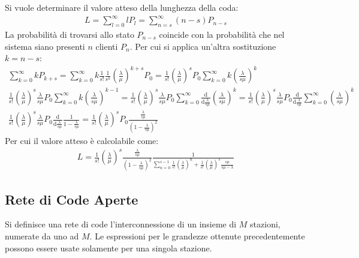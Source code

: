 \documentclass{article}
\newcommand{\df}{\mathrm{d}}
\numberwithin{equation}{subsection}
\begin{document}
Si vuole determinare il valore atteso della lunghezza della coda:
\begin{gather*}
    L=\displaystyle\sum_{l=0}^{\infty}lP_l=\sum_{n=s}^{\infty}(n-s)P_{n-s}
\end{gather*}
La probabilità di trovarsi allo stato $P_{n-s}$ coincide con la probabilità che nel sistema siano presenti $n$ clienti $P_n$. Per cui si applica un'altra sostituzione $k=n-s$:
\begin{gather*}
    \displaystyle\sum_{k=0}^{\infty}kP_{k+s}=\sum_{k=0}^{\infty}k\frac{1}{s!}\frac{1}{s^k}\left(\frac{\lambda}{\mu}\right)^{k+s}P_0=\frac{1}{s!}\left(\frac{\lambda}{\mu}\right)^{s}P_0\sum_{k=0}^{\infty}k\left(\frac{\lambda}{s\mu}\right)^{k}\\
    \displaystyle\frac{1}{s!}\left(\frac{\lambda}{\mu}\right)^{s}\frac{\lambda}{s\mu}P_0\sum_{k=0}^{\infty}k\left(\frac{\lambda}{s\mu}\right)^{k-1}=\frac{1}{s!}\left(\frac{\lambda}{\mu}\right)^{s}\frac{\lambda}{s\mu}P_0\sum_{k=0}^{\infty}\frac{\df}{\df\frac{\lambda}{s\mu}}\left(\frac{\lambda}{s\mu}\right)^{k}
    =\frac{1}{s!}\left(\frac{\lambda}{\mu}\right)^{s}\frac{\lambda}{s\mu}P_0\frac{\df}{\df\frac{\lambda}{s\mu}}\sum_{k=0}^{\infty}\left(\frac{\lambda}{s\mu}\right)^{k}\\
    \frac{1}{s!}\left(\frac{\lambda}{\mu}\right)^{s}\frac{\lambda}{s\mu}P_0\frac{\df}{\df\frac{\lambda}{s\mu}}\frac{1}{1-\displaystyle\frac{\lambda}{s\mu}}=\frac{1}{s!}\left(\frac{\lambda}{\mu}\right)^{s}P_0\frac{\displaystyle\frac{\lambda}{s\mu}}{\left(1-\displaystyle\frac{\lambda}{s\mu}\right)^2}
\end{gather*}
Per cui il valore atteso è calcolabile come:
\begin{gather}
    L=\frac{1}{s!}\left(\frac{\lambda}{\mu}\right)^{s}\frac{\displaystyle\frac{\lambda}{s\mu}}{\left(1-\displaystyle\frac{\lambda}{s\mu}\right)^2}\frac{1}{\displaystyle\sum_{n=0}^{s-1}\frac{1}{s!}\left(\frac{\lambda}{\mu}\right)^n+\frac{1}{s!}\left(\frac{\lambda}{\mu}\right)^s\frac{s\mu}{s\mu-\lambda}}
\end{gather}

\subsection{Rete di Code Aperte}

Si definisce una rete di code l'interconnessione di un insieme di $M$ stazioni, numerate da uno ad $M$. Le espressioni per le grandezze ottenute precedentemente possono essere 
usate solamente per una singola stazione. 
\end{document}
